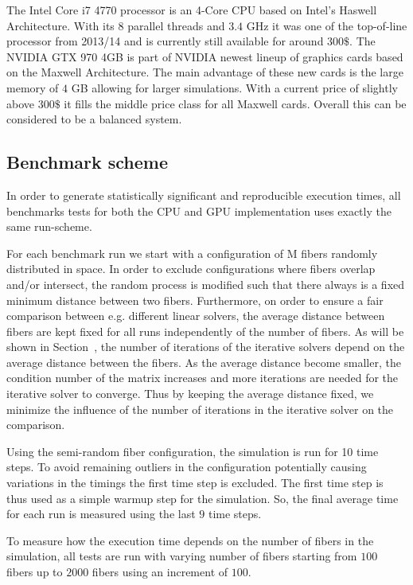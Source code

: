 The Intel Core i7 4770 processor is an 4-Core CPU based on Intel's Haswell Architecture. With its 8 parallel threads and $3.4$ GHz it was one of the top-of-line processor from 2013/14 and is currently still available for around $300\$$. The NVIDIA GTX 970 4GB is part of NVIDIA newest lineup of graphics cards based on the Maxwell Architecture. The main advantage of these new cards is the large memory of $4$ GB allowing for larger simulations. With a current price of slightly above $300\$$ it fills the middle price class for all Maxwell cards. Overall this can be considered to be a balanced system.

\subsection{Benchmark scheme}

In order to generate statistically significant and reproducible execution times, all benchmarks tests for both the CPU and GPU implementation uses exactly the same run-scheme.

For each benchmark run we start with a configuration of M fibers randomly distributed in space. In order to exclude configurations where fibers overlap and/or intersect, the random process is modified such that there always is a fixed minimum distance between two fibers. Furthermore, on order to ensure a fair comparison between e.g. different linear solvers, the average distance between fibers are kept fixed for all runs independently of the number of fibers. As will be shown in Section~, the number of iterations of the iterative solvers depend on the average distance between the fibers. As the average distance become smaller, the condition number of the matrix increases and more iterations are needed for the iterative solver to converge. Thus by keeping the average distance fixed, we minimize the influence of the number of iterations in the iterative solver on the comparison.

Using the semi-random fiber configuration, the simulation is run for 10 time steps. To avoid remaining outliers in the configuration potentially causing variations in the timings the first time step is excluded. The first time step is thus used as a simple warmup step for the simulation. So, the final average time for each run is measured using the last $9$ time steps.

To measure how the execution time depends on the number of fibers in the simulation, all tests are run with varying number of fibers starting from $100$ fibers up to $2000$ fibers using an increment of $100$.

